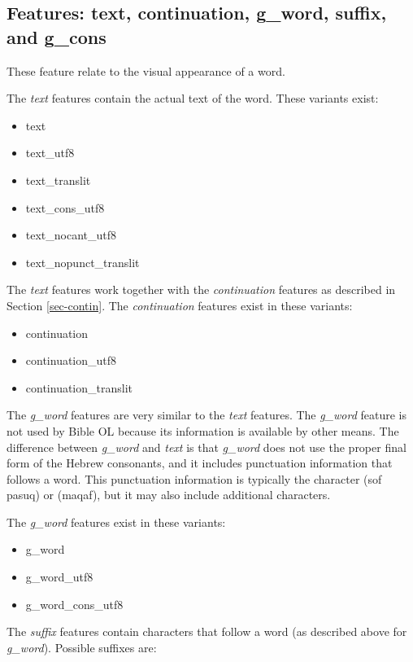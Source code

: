 \documentclass[11pt,oneside,a4paper]{memoir}
\newcommand{\heb}[1]{{\RL {\ezr #1}}}
\begin{document}
\subsection{Features: text, continuation, g\_word, suffix, and g\_cons}\label{suffix}

These feature relate to the visual appearance of a word.

The \emph{text} features contain the actual text of the word. These variants exist:

\begin{itemize}
\item text
\item text\_utf8
\item text\_translit
\item text\_cons\_utf8
\item text\_nocant\_utf8
\item text\_nopunct\_translit
\end{itemize}

The \emph{text} features work together with the \emph{continuation} features as described in Section
\ref{sec-contin}. The \emph{continuation} features exist
in these variants:

\begin{itemize}
\item continuation
\item continuation\_utf8
\item continuation\_translit
\end{itemize}

The \emph{g\_word} features are very similar to the \emph{text} features.
The \emph{g\_word} feature is not used by Bible OL because its information is available by other means. The
difference between \emph{g\_word} and \emph{text} is that \emph{g\_word} does not use the proper final form of the Hebrew
consonants, and it includes punctuation information that follows a word. This punctuation information
is typically the character \heb{׃} (sof pasuq) or \heb{־} (maqaf), but it may also include
additional characters.

The \emph{g\_word} features exist in these variants:

\begin{itemize}
\item g\_word
\item g\_word\_utf8
\item g\_word\_cons\_utf8
\end{itemize}

The \emph{suffix} features contain characters that follow a word (as
described above for \emph{g\_word}). Possible suffixes are:
\end{document}
